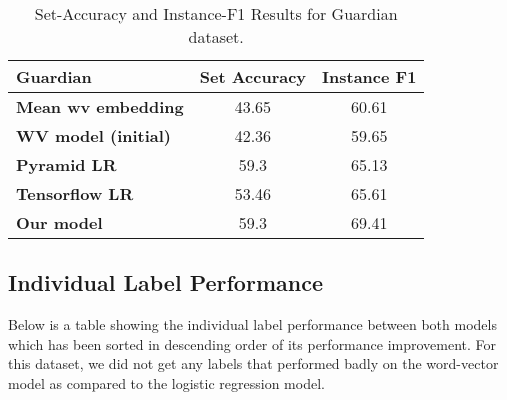 \begin{table}[htbp]
\centering
\begin{tabular}{l|c|c}
Guardian & \multicolumn{1}{l|}{\textbf{Set Accuracy}} & \textbf{Instance F1} \\ \hline
\textbf{Mean wv embedding} & 43.65 & 60.61 \\
\textbf{WV model (initial)} & 42.36 & 59.65 \\
\textbf{Pyramid LR} & 59.3 & 65.13 \\
\textbf{Tensorflow LR} & 53.46 & 65.61 \\
\textbf{Our model} & 59.3 & 69.41
\end{tabular}
\caption{\label{tab:widgets}Set-Accuracy and Instance-F1 Results for Guardian dataset.}
\end{table}

\subsection{Individual Label Performance}

Below is a table showing the individual label performance between both models which has been sorted in descending order of its performance improvement. For this dataset, we did not get any labels that performed badly on the word-vector model as compared to the logistic regression model.\\

